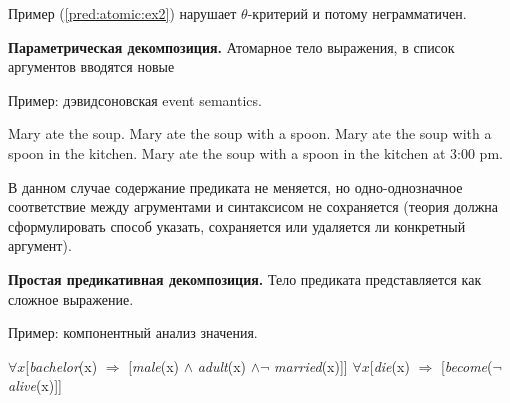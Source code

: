 \documentclass[10pt]{article}
\theoremstyle{example-style}
\begin{document}
Пример (\ref{pred:atomic:ex2}) нарушает $\theta$-критерий и потому неграмматичен.

\textbf{Параметрическая декомпозиция.} Атомарное тело выражения, в список аргументов вводятся новые

\begin{exe}
\end{exe}

Пример: дэвидсоновская event semantics.

\begin{exe}
\ex 
  \begin{xlist}
    \ex Mary ate the soup.
    \ex Mary ate the soup with a spoon.
    \ex Mary ate the soup with a spoon in the kitchen.
    \ex Mary ate the soup with a spoon in the kitchen at 3:00 pm.
  \end{xlist}
\ex 
  \begin{xlist}
  \end{xlist}
\end{exe}

В данном случае содержание предиката не меняется, но одно-однозначное соответствие между агрументами и синтаксисом не сохраняется (теория должна сформулировать способ указать, сохраняется или удаляется ли конкретный аргумент).

\textbf{Простая предикативная декомпозиция.} Тело предиката представляется как сложное выражение.

\begin{exe}
\end{exe}

Пример: компонентный анализ значения.

\begin{exe}
  \ex $\forall x$[\textit{bachelor}(x) $\Rightarrow$ [\textit{male}(x) $\wedge$ \textit{adult}(x) $\wedge \neg$ \textit{married}(x)]]  
  \ex $\forall x$[\textit{die}(x) $\Rightarrow$ [\textit{become}($\neg$ \textit{alive}(x)]]
\end{exe}
\end{document}
